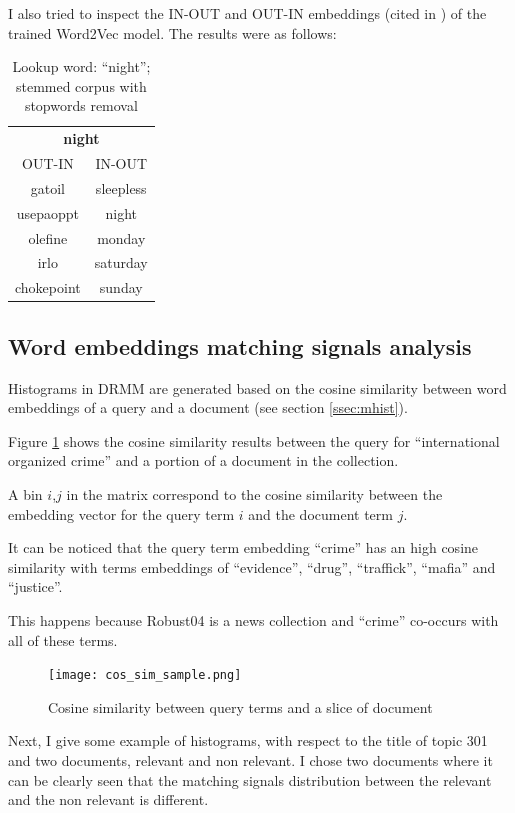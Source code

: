 I also tried to inspect the IN-OUT and OUT-IN embeddings (cited in \cite{Mitra2016ADE}) of the trained Word2Vec model. The results were as follows:

\begin{table}[H]
\centering
\begin{tabular}{cc}
\hline
\multicolumn{2}{c}{\textbf{night}} \\
OUT-IN & IN-OUT \\ \hline
gatoil & sleepless \\
usepaoppt & night \\
olefine & monday \\
irlo & saturday \\
chokepoint & sunday \\
\hline
\end{tabular}
\caption{Lookup word: ``night''; stemmed corpus with stopwords removal}
\label{tab:embsim2}
\end{table}

\subsection{Word embeddings matching signals analysis}

Histograms in DRMM are generated based on the cosine similarity between word embeddings of a query and a document (see section \ref{ssec:mhist}).

Figure \ref{fig:cos_sim_sample} shows the cosine similarity results between the query for ``international organized crime'' and a portion of a document in the collection.

A bin $i$,$j$ in the matrix correspond to the cosine similarity between the embedding vector for the query term $i$ and the document term $j$.

It can be noticed that the query term embedding ``crime'' has an high cosine similarity with terms embeddings of ``evidence'', ``drug'', ``traffick'', ``mafia'' and ``justice''.

This happens because Robust04 \cite{rob04} is a news collection and ``crime'' co-occurs with all of these terms.

\begin{figure}[H]
  \centering
  \texttt{[image: cos\_sim\_sample.png]}
  \caption{Cosine similarity between query terms and a slice of document}
  \label{fig:cos_sim_sample}
\end{figure}

Next, I give some example of histograms, with respect to the title of topic 301 and two documents, relevant and non relevant. I chose two documents where it can be clearly seen that the matching signals distribution between the relevant and the non relevant is different.

